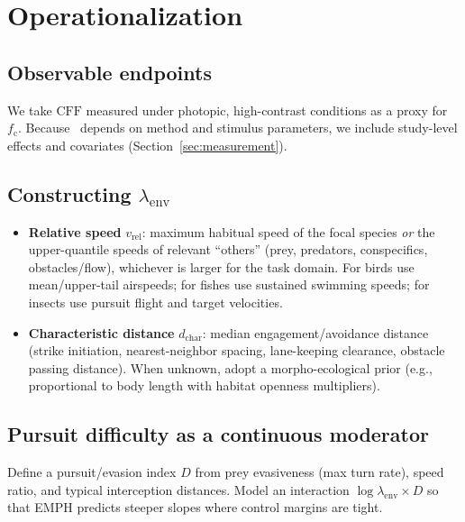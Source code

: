 \documentclass[11pt]{article}
\newcommand{\fc}{f_{\mathrm{c}}}             %
\newcommand{\cff}{\mathrm{CFF}}               %
\newcommand{\vrel}{v_{\mathrm{rel}}}          %
\newcommand{\dchar}{d_{\mathrm{char}}}        %
\newcommand{\lamenv}{\lambda_{\mathrm{env}}}  %
\begin{document}
\section{Operationalization}
\subsection{Observable endpoints}
We take $\cff$ measured under photopic, high-contrast conditions as a proxy for $\fc$. Because \cff\ depends on method and stimulus parameters, we include study-level effects and covariates (Section~\ref{sec:measurement}).

\subsection{Constructing $\lamenv$}
\begin{itemize}[leftmargin=1.25em]
\item \textbf{Relative speed} $\vrel$: maximum habitual speed of the focal species \emph{or} the upper-quantile speeds of relevant ``others'' (prey, predators, conspecifics, obstacles/flow), whichever is larger for the task domain. For birds use mean/upper-tail airspeeds; for fishes use sustained swimming speeds; for insects use pursuit flight and target velocities. \citep{Alerstam2007,FishBaseSpeed}
\item \textbf{Characteristic distance} $\dchar$: median engagement/avoidance distance (strike initiation, nearest-neighbor spacing, lane-keeping clearance, obstacle passing distance). When unknown, adopt a morpho-ecological prior (e.g., proportional to body length with habitat openness multipliers).
\end{itemize}

\subsection{Pursuit difficulty as a continuous moderator}
\label{sec:pursuit}
Define a pursuit/evasion index $D$ from prey evasiveness (max turn rate), speed ratio, and typical interception distances. Model an interaction $\log\lamenv \times D$ so that EMPH predicts steeper slopes where control margins are tight.

\end{document}
